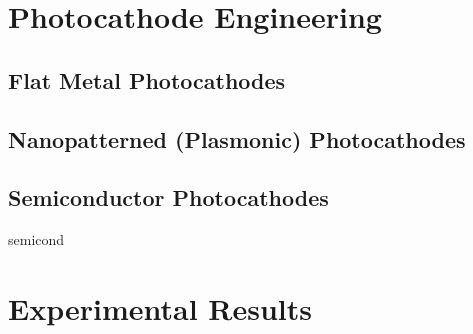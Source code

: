 \documentclass{uicthesi}
\begin{document}
\chapter{Photocathode Engineering}

\section{Flat Metal Photocathodes}

\section{Nanopatterned (Plasmonic) Photocathodes}

\section{Semiconductor Photocathodes}

  {semicond}

\chapter{Experimental Results}

 


\end{document}
